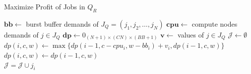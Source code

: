 \begin{algorithm}[t]
\caption{Maximize Profit of Jobs in $Q_R$}
\label{Alg-MaxCPU}
\begin{algorithmic}[1]
        \State $\boldsymbol{bb} \gets $ burst buffer demands of $J_Q = (j_1, j_2,\ldots, j_N)$
        \State $\boldsymbol{cpu} \gets $ compute nodes demands of $j \in J_Q$
        \State $\boldsymbol{dp} \gets 0_{(N+1) \times (CN) \times (BB+1)}$
        \State $\boldsymbol{v} \gets$ values of $j \in J_Q$
        \State $\mathcal{J} \gets \emptyset$
                                                \State $dp(i, c, w) \gets \max\{dp(i-1, c-cpu_i, w-bb_i)+v_i, dp(i-1, c, w)\}$
                                        \Else
                                                \State $dp(i,c,w) \gets dp(i-1,c,w)$
                                        \EndIf
                                \EndFor
                        \EndFor
                \EndFor
                \State {}
        \EndFunction
        \\
                                        \State $\mathcal{J} = \mathcal{J} \cup j_i$
                                        \State {}
                                \Else
                                        \State {}
                                \EndIf
                        \Else
                                \State {}
                        \EndIf
                \EndIf
        \EndFunction
\end{algorithmic}
\end{algorithm}



